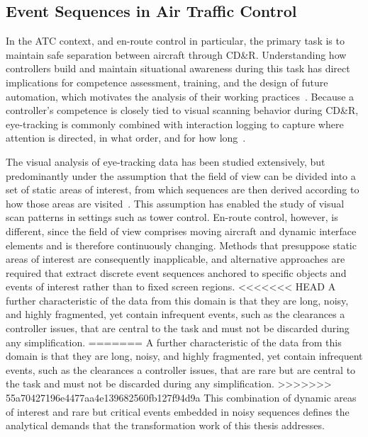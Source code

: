 \subsection{Event Sequences in Air Traffic Control}

In the ATC context, and en-route control in particular, the primary task is to maintain safe separation between aircraft through CD\&R.
Understanding how controllers build and maintain situational awareness during this task has direct implications for competence assessment, training, and the design of future automation, which motivates the analysis of their working practices~\cite{lundberg2015situation}.
Because a controller's competence is closely tied to visual scanning behavior during CD\&R, eye-tracking is commonly combined with interaction logging to capture where attention is directed, in what order, and for how long~\cite{westin2019visual, meyer2022mapping}.

The visual analysis of eye-tracking data has been studied extensively, but predominantly under the assumption that the field of view can be divided into a set of static areas of interest, from which sequences are then derived according to how those areas are visited~\cite{blascheck2014state, burch2022eye, raschke2014visual}.
This assumption has enabled the study of visual scan patterns in settings such as tower control.
En-route control, however, is different, since the field of view comprises moving aircraft and dynamic interface elements and is therefore continuously changing.
Methods that presuppose static areas of interest are consequently inapplicable, and alternative approaches are required that extract discrete event sequences anchored to specific objects and events of interest rather than to fixed screen regions.
<<<<<<< HEAD
A further characteristic of the data from this domain is that they are long, noisy, and highly fragmented, yet contain infrequent events, such as the clearances a controller issues, that are central to the task and must not be discarded during any simplification.
=======
A further characteristic of the data from this domain is that they are long, noisy, and highly fragmented, yet contain infrequent events, such as the clearances a controller issues, that are rare but are central to the task and must not be discarded during any simplification.
>>>>>>> 55a70427196e4477aa4e139682560fb127f94d9a
This combination of dynamic areas of interest and rare but critical events embedded in noisy sequences defines the analytical demands that the transformation work of this thesis addresses.


